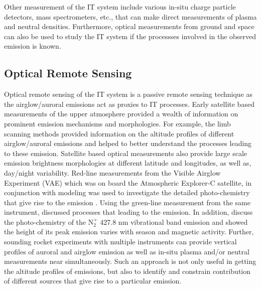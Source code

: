 \documentclass[crop=false,class=mitthesis,oneside,font=12pt]{standalone}
\begin{document}
Other measurement of the IT system include various in-situ charge particle detectors, mass spectrometers, etc., that can make direct measurements of plasma and neutral densities. Furthermore, optical measurements from ground and space can also be used to study the IT system if the processses involved in the observed emission is known. 

\subsection{Optical Remote Sensing}

Optical remote sensing of the IT system is a passive remote sensing technique as the airglow/auroral emissions act as proxies to IT processes. Early satellite based measurements of the upper atmosphere provided a wealth of information on prominent emission mechanisms and morphologies. For example, the limb scanning methods provided information on the altitude profiles of different airglow/auroral emissions and helped to better understand the processes leading to these emission. Satellite based optical measurements also provide large scale emission brightness morphologies at different latitude and longitudes, as well as, day/night variability. Red-line measurements from the Visible Airglow Experiment (VAE) which was on board the Atmospheric Explorer-C satellite, in conjunction with modeling was used to investigate the detailed photo-chemistry that give rise to the emission \citep{hays1978}. Using the green-line measurement from the same instrument, \cite{frederick1976} discussed processes that leading to the emission. In addition, \citet{orsini1977determination} discuss the photo-chemistry of the N$_2^+$ 427.8 nm vibrational band emission and  showed the height of its peak emission varies with season and magnetic activity. Further, sounding rocket experiments with multiple instruments can provide vertical profiles of auroral and airglow emission as well as in-situ plasma and/or neutral measurements near simultaneously. Such an approach is not only useful in getting the altitude profiles of emissions, but also to identify and constrain contribution of different sources that give rise to a particular emission.
\end{document}
